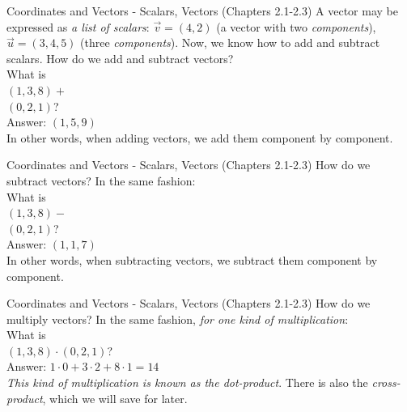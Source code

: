 \documentclass{beamer}
\begin{document}
\begin{frame}{Coordinates and Vectors - Scalars, Vectors (Chapters 2.1-2.3)}
A vector may be expressed as \textit{a list of scalars}: $\vec{v} = (4,2)$ (a vector with two \textit{components}), $\vec{u} = (3,4,5)$ (three \textit{components}).  Now, we know how to add and subtract scalars.  How do we add and subtract vectors? \\
\vspace{0.5cm}
What is\\
$(1,3,8)+$\\ $(0,2,1)$? \\
Answer: $(1,5,9)$ \\
\vspace{0.5cm}
In other words, when adding vectors, we add them component by component.
\end{frame}

\begin{frame}{Coordinates and Vectors - Scalars, Vectors (Chapters 2.1-2.3)}
How do we subtract vectors? In the same fashion:\\
\vspace{0.5cm}
What is\\
$(1,3,8)-$\\ $(0,2,1)$? \\
Answer: $(1,1,7)$ \\
\vspace{0.5cm}
In other words, when subtracting vectors, we subtract them component by component.
\end{frame}

\begin{frame}{Coordinates and Vectors - Scalars, Vectors (Chapters 2.1-2.3)}
How do we multiply vectors? In the same fashion, \textit{for one kind of multiplication}:\\
\vspace{0.5cm}
What is\\
$(1,3,8)\cdot (0,2,1)$? \\
Answer: $1\cdot 0 + 3 \cdot 2 + 8 \cdot 1 = 14$ \\
\vspace{0.5cm}
\textit{This kind of multiplication is known as the dot-product}.  There is also the \textit{cross-product}, which we will save for later.
\end{frame}
\end{document}
